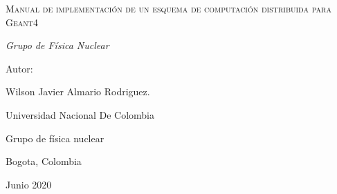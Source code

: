 \documentclass{article}
\begin{document}
\begin{titlepage}
    \centering
    \vspace{4cm}
    {\scshape\Huge Manual de implementación de un esquema de computación distribuida para Geant4 \par}
    \vspace{3cm}
  {\itshape\Large Grupo de Física Nuclear \par}
    \vfill
    {\Large Autor: \par}
     \vspace{0.5cm}
    {Wilson Javier Almario Rodriguez.}\\
    \vfill
    {\Large Universidad Nacional De Colombia \par}
    {\Large Grupo de física nuclear \par}
    {\Large Bogota, Colombia \par}
    {\Large Junio 2020 \par}
    
\end{titlepage}


\tableofcontents

\clearpage

%


%
%


%





%
%
%
%
%



%
\end{document}
